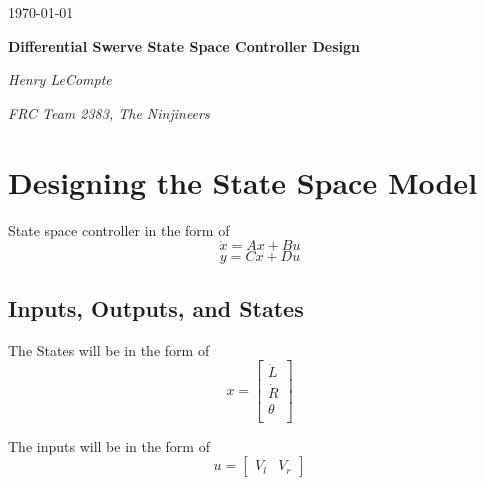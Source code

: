 \documentclass{scrartcl}
\begin{document}
\begin{titlepage}
    \centering
    {\large \today\par}
    \vfill

    {\huge\bfseries Differential Swerve State Space Controller Design\par}
    \vfill

    {\Large\itshape Henry LeCompte}\par
    {\itshape FRC Team 2383, The Ninjineers}\par
    \vspace{1.5cm}

    \vfill
\end{titlepage}

\newpage

\doublespacing
\tableofcontents
\singlespacing

\newpage

\doublespacing

\section{Designing the State Space Model}

State space controller in the form of
\begin{equation} \label{state-change}
    \dot{x} = Ax + Bu
\end{equation}
\begin{equation} \label{output}
    y = Cx + Du
\end{equation}

\subsection{Inputs, Outputs, and States}
The States will be in the form of
\begin{equation}
    x =
    \begin{bmatrix}
        \dot{L} \\
        \dot{R} \\
        \theta  \\
    \end{bmatrix}
\end{equation}

The inputs will be in the form of
\begin{equation}
    u =
    \begin{bmatrix}
        V_l & V_r
    \end{bmatrix}
\end{equation}
\end{document}
